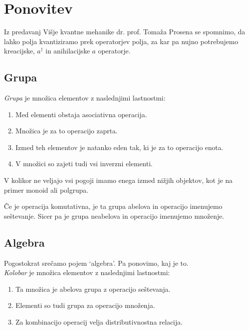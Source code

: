 \section{Ponovitev}

Iz predavanj Vi\v sje kvantne mehanike dr. prof. Toma\v za Prosena se spomnimo, da lahko polja
kvantiziramo prek operatorjev polja, za kar pa nujno potrebujemo kreacijske, $a^\dagger$ in 
anihilacijske $a$ operatorje.

\subsection{Grupa}

\vspace{0.5 cm}

{\em Grupa} je mno\v zica elementov z naslednjimi lastnostmi:

\begin{enumerate}
	\item{Med elementi obstaja asociativna operacija.}
	\item{Mno\v zica je za to operacijo zaprta.}
	\item{Izmed teh elementov je natanko eden tak, ki je za to operacijo enota.}
	\item{V mno\v zici so zajeti tudi vsi inverzni elementi.}
\end{enumerate}

V kolikor ne veljajo vsi pogoji imamo enega izmed ni\v zjih objektov, kot je na primer monoid
ali polgrupa.

\v Ce je operacija komutativna, je ta grupa abelova in operacijo imenujemo se\v stevanje. Sicer
pa je grupa neabelova in operacijo imenujemo mno\v zenje.

\subsection{Algebra}

\vspace{0.5cm}

Pogostokrat sre\v camo pojem `algebra'. Pa ponovimo, kaj je to.\\

\emph{Kolobar} je mno\v zica elementov z naslednjimi lastnostmi:

\begin{enumerate}
	\item{Ta mno\v zica je abelova grupa z operacijo se\v stevanja.}
	\item{Elementi so tudi grupa za operacijo mno\v zenja.}
	\item{Za kombinacijo operacij velja distributivnostna relacija.}
\end{enumerate}


